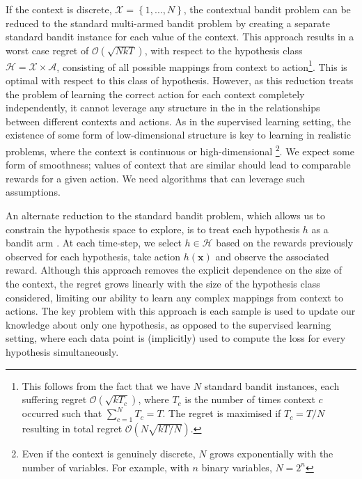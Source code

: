 \documentclass[11pt,a4paper,oneside]{book}
\newcommand{\actionspace}{\mathcal{A}}
\newcommand{\set}[1]{\left\{#1\right\}}
\newcommand{\bigo}[1]{\mathcal{O}\left( #1 \right)}
\renewcommand{\vec}[1]{\boldsymbol{#1}}
\theoremstyle{plain}
\theoremstyle{definition}
\begin{document}
If the context is discrete, $\mathcal{X} = \set{1,...,N}$, the contextual bandit problem can be reduced to the standard multi-armed bandit problem by creating a separate standard bandit instance for each value of the context. This approach results in a worst case regret of $\bigo{\sqrt{NkT}}$, with respect to the hypothesis class $\mathcal{H} = \mathcal{X} \times \actionspace$, consisting of all possible mappings from context to action\footnote{This follows from the fact that we have $N$ standard bandit instances, each suffering regret $\bigo{\sqrt{kT_c}}$, where $T_c$ is the number of times context $c$ occurred such that $\sum_{c=1}^N T_c = T$. The regret is maximised if $T_c = T/N$ resulting in total regret $\bigo{N\sqrt{kT/N}}$.}. This is optimal with respect to this class of hypothesis. However, as this reduction treats the problem of learning the correct action for each context completely independently, it cannot leverage any structure in the in the relationships between different contexts and actions. As in the supervised learning setting, the existence of some form of low-dimensional structure is key to learning in realistic problems, where the context is continuous or high-dimensional \footnote{Even if the context is genuinely discrete, $N$ grows exponentially with the number of variables. For example, with $n$ binary variables, $N = 2^n$}. We expect some form of smoothness; values of context that are similar should lead to comparable rewards for a given action. We need algorithms that can leverage such assumptions. 

An alternate reduction to the standard bandit problem, which allows us to constrain the hypothesis space to explore, is to treat each hypothesis $h$ as a bandit arm \citep{Langford2008}. At each time-step, we select $h \in \mathcal{H}$ based on the rewards previously observed for each hypothesis, take action $h(\vec{x})$ and observe the associated reward. Although this approach removes the explicit dependence on the size of the context, the regret  grows linearly with the size of the hypothesis class considered, limiting our ability to learn any complex mappings from context to actions. The key problem with this approach is each sample is used to update our knowledge about only one hypothesis, as opposed to the supervised learning setting, where each data point is (implicitly) used to compute the loss for every hypothesis simultaneously. 
\end{document}
